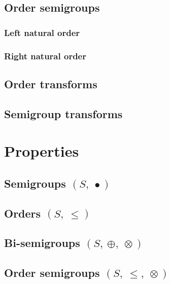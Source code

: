 \documentclass[10pt]{article}
\begin{document}
\subsection{Order semigroups} 
\label{sec:ordersemigroups:def} 
\subsubsection{Left natural order}
\label{sec:osllte:def} 
 
\subsubsection{Right natural order}
\label{sec:osllte:def} 
 

\subsection{Order transforms} 
\label{sec:ordertransforms:def} 

\subsection{Semigroup transforms} 
\label{sec:semigrouptransforms:def} 

\section{Properties}
\label{sec:properties} 
 
\subsection{Semigroups $(S,\ \bullet)$} 
\label{sec:semigroups:props}  
 
\subsection{Orders $(S,\ \leq)$} 
\label{sec:orders:props}  
 
\subsection{Bi-semigroups $(S,\ \oplus,\ \otimes)$} 
\label{sec:bisemigroups:props} 
\subsection{Order semigroups $(S,\ \leq,\ \otimes)$} 
\label{sec:ordersemigroups:props} 
\end{document}
